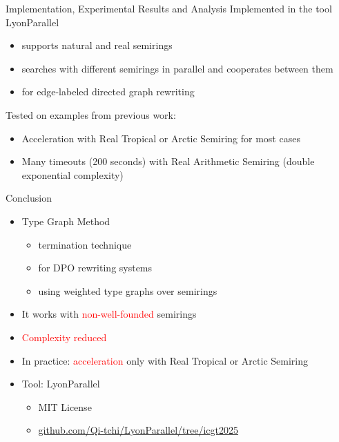 \documentclass{beamer}
\begin{document}
\begin{frame}{Implementation, Experimental Results and Analysis}
  \alert{Implemented} in the tool LyonParallel
        \begin{itemize}
          \item supports natural and real semirings
          \item searches with different semirings in parallel and cooperates between them
          \item for edge-labeled directed graph rewriting
        \end{itemize}

  \alert{Tested} on examples from previous work:
  \begin{itemize}
    \item \alert{Acceleration} with \alert{Real Tropical} or \alert{Arctic Semiring} for most cases
    \item Many \alert{timeouts} (200 seconds) with \alert{Real Arithmetic Semiring} (double exponential complexity)
  \end{itemize}
\end{frame}

\begin{frame}{Conclusion}
  \begin{itemize}
    \item Type Graph Method 
         \begin{itemize}
          \item termination technique
          \item for DPO rewriting systems
          \item using weighted type graphs over semirings
         \end{itemize}
    \item It works with \textcolor{red}{non-well-founded} semirings
    \item \textcolor{red}{Complexity reduced}
    \item In practice: \textcolor{red}{acceleration} only with Real Tropical or Arctic Semiring
    \item Tool: LyonParallel
        \begin{itemize}
          \item MIT License
          \item \url{github.com/Qi-tchi/LyonParallel/tree/icgt2025}
        \end{itemize}
  \end{itemize}
\end{frame} 
\end{document}
